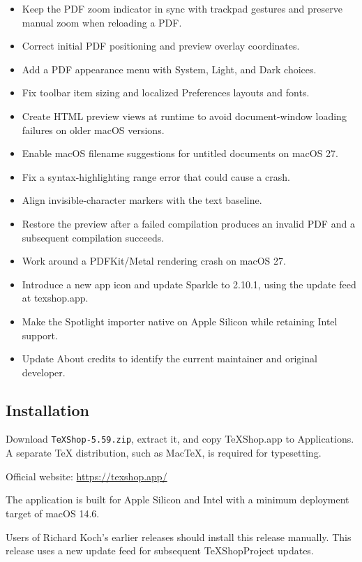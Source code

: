\documentclass[11pt,letterpaper]{article}
\begin{document}
\begin{itemize}
\item Keep the PDF zoom indicator in sync with trackpad gestures and preserve manual zoom when reloading a PDF.
\item Correct initial PDF positioning and preview overlay coordinates.
\item Add a PDF appearance menu with System, Light, and Dark choices.
\item Fix toolbar item sizing and localized Preferences layouts and fonts.
\item Create HTML preview views at runtime to avoid document-window loading failures on older macOS versions.
\item Enable macOS filename suggestions for untitled documents on macOS 27.
\item Fix a syntax-highlighting range error that could cause a crash.
\item Align invisible-character markers with the text baseline.
\item Restore the preview after a failed compilation produces an invalid PDF and a subsequent compilation succeeds.
\item Work around a PDFKit/Metal rendering crash on macOS 27.
\item Introduce a new app icon and update Sparkle to 2.10.1, using the update feed at texshop.app.
\item Make the Spotlight importer native on Apple Silicon while retaining Intel support.
\item Update About credits to identify the current maintainer and original developer.
\end{itemize}

\subsection{Installation}

Download \texttt{TeXShop-5.59.zip}, extract it, and copy TeXShop.app to Applications. A separate TeX distribution, such as MacTeX, is required for typesetting.


Official website: \url{https://texshop.app/}


The application is built for Apple Silicon and Intel with a minimum deployment target of macOS 14.6.


Users of Richard Koch's earlier releases should install this release manually. This release uses a new update feed for subsequent TeXShopProject updates.

\clearpage
{}

\end{document}
